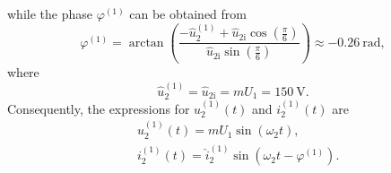\begin{solutionblock}
    while the phase $\varphi^\mathrm{(1)}$ can be obtained from
    \begin{equation}
        \varphi^\mathrm{(1)} = \arctan(\frac{-\hat{u}^\mathrm{(1)}_\mathrm{2} + \hat{u}_{2\mathrm{i}} \cos(\frac{\pi}{6})}{\hat{u}_{2\mathrm{i}} \sin(\frac{\pi}{6})}) \approx \SI{-0.26}{\radian},
        \label{7.1.2:eq:phase_i_2_fund}         
    \end{equation}
    where 
    \begin{equation}
        \hat{u}^\mathrm{(1)}_\mathrm{2} =  \hat{u}_{2\mathrm{i}} = m U_1 = \SI{150}{\volt}. 
        \label{7.1.2:eq:u_2_fund_ui}          
    \end{equation}
    Consequently, the expressions for $u^\mathrm{(1)}_\mathrm{2}(t)$ and $i^\mathrm{(1)}_\mathrm{2}(t)$ are
    \begin{equation}
        \begin{aligned}
            &u^\mathrm{(1)}_\mathrm{2}(t) = m U_{\mathrm{1}} \sin(\omega_2 t),\\
            &i^\mathrm{(1)}_\mathrm{2}(t) = \hat{i}^\mathrm{(1)}_\mathrm{2} \sin(\omega_2 t - \varphi^\mathrm{(1)}).
        \end{aligned}
        \label{7.1.2:eq:i_u_2_fund}          
    \end{equation}
\end{solutionblock}

